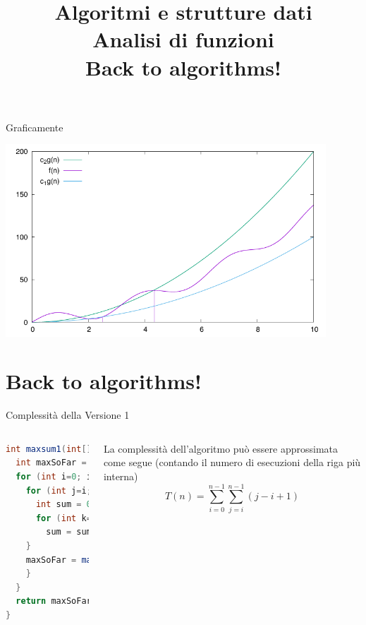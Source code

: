 \begin{frame}{Graficamente}
  
\begin{center}
\vspace{-12pt}
\includegraphics[width=0.9\textwidth]{plot-3.pdf}
\end{center}
  
\end{frame}


%





\title[ASD - Analisi di funzioni]{\textbf{Algoritmi e strutture dati}\\[12pt]Analisi di funzioni\\Back to algorithms!}

\FrameTitle{}

\section{Back to algorithms!}

\begin{frame}[fragile]{Complessità della Versione 1}

\begin{columns}[T]
\small
\begin{lstlisting}[language=java]
int maxsum1(int[] A, int n) {
  int maxSoFar = 0;
  for (int i=0; i < n; i++) {
    for (int j=i; j < n; j++) {
      int sum = 0;
      for (int k=i; k <= j; k++) {
        sum = sum + A[k];
    }
    maxSoFar = max(maxSoFar, sum);
    }
  }
  return maxSoFar;
}
\end{lstlisting}
La complessità dell'algoritmo può essere approssimata come segue (contando
il numero di esecuzioni della riga più interna)
\[
T(n) = \sum_{i=0}^{n-1} \sum_{j=i}^{n-1} (j-i+1)
\]
\end{columns}

\end{frame}

